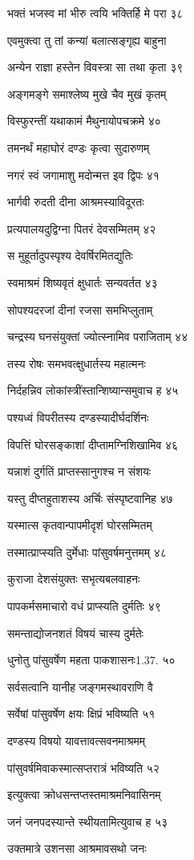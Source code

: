 भक्तं भजस्व मां भीरु त्वयि भक्तिर्हि मे परा ३८

एवमुक्त्वा तु तां कन्यां बलात्सङ्गृह्य बाहुना

अन्येन राज्ञा हस्तेन विवस्त्रा सा तथा कृता ३९

अङ्गमङ्गे समाश्लेष्य मुखे चैव मुखं कृतम्

विस्फुरन्तीं यथाकामं मैथुनायोपचक्रमे ४०

तमनर्थं महाघोरं दण्डः कृत्वा सुदारुणम्

नगरं स्वं जगामाशु मदोन्मत्त इव द्विपः ४१

भार्गवी रुदती दीना आश्रमस्याविदूरतः

प्रत्यपालयदुद्विग्ना पितरं देवसम्मितम् ४२

स मुहूर्तादुपस्पृश्य देवर्षिरमितद्युतिः

स्वमाश्रमं शिष्यवृतं क्षुधार्तः सन्यवर्तत ४३

सोपश्यदरजां दीनां रजसा समभिप्लुताम्

चन्द्रस्य घनसंयुक्तां ज्योत्स्नामिव पराजिताम् ४४

तस्य रोषः समभवत्क्षुधार्तस्य महात्मनः

निर्दहन्निव लोकांस्त्रींस्तान्शिष्यान्समुवाच ह ४५

पश्यध्वं विपरीतस्य दण्डस्यादीर्घदर्शिनः

विपत्तिं घोरसङ्काशां दीप्तामग्निशिखामिव ४६

यन्नाशं दुर्गतिं प्राप्तस्सानुगश्च न संशयः

यस्तु दीप्तहुताशस्य अर्चिः संस्पृष्टवानिह ४७

यस्मात्स कृतवान्पापमीदृशं घोरसम्मितम्

तस्मात्प्राप्स्यति दुर्मेधाः पांसुवर्षमनुत्तमम् ४८

कुराजा देशसंयुक्तः सभृत्यबलवाहनः

पापकर्मसमाचारो वधं प्राप्स्यति दुर्मतिः ४९

समन्ताद्योजनशतं विषयं चास्य दुर्मतेः

धुनोतु पांसुवर्षेण महता पाकशासनः1.37. ५०

सर्वसत्वानि यानीह जङ्गमस्थावराणि वै

सर्वेषां पांसुवर्षेण क्षयः क्षिप्रं भविष्यति ५१

दण्डस्य विषयो यावत्तावत्सवनमाश्रमम्

पांसुवर्षमिवाकस्मात्सप्तरात्रं भविष्यति ५२

इत्युक्त्वा क्रोधसन्तप्तस्तमाश्रमनिवासिनम्

जनं जनपदस्यान्ते स्थीयतामित्युवाच ह ५३

उक्तमात्रे उशनसा आश्रमावसथो जनः

